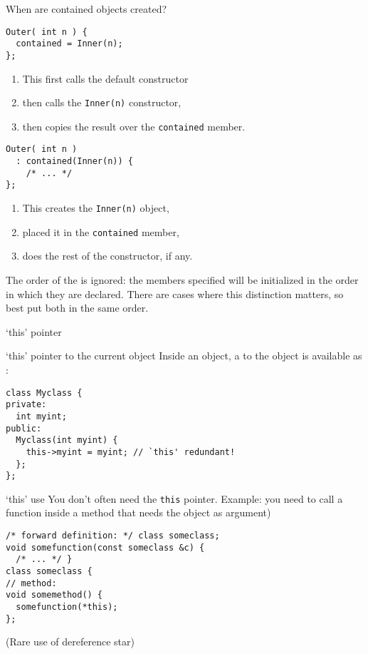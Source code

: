 \begin{block}{When are contained objects created?}
  \label{sl:construct-contained2}
\begin{multicols}{2}
\begin{lstlisting}
Outer( int n ) {
  contained = Inner(n);
};
\end{lstlisting}
  \begin{enumerate}
  \item This first calls the default constructor
  \item then calls the \lstinline+Inner(n)+ constructor,
  \item then copies the result over the \lstinline+contained+ member.
  \end{enumerate}
\columnbreak
\begin{lstlisting}
Outer( int n ) 
  : contained(Inner(n)) {
    /* ... */
};
\end{lstlisting}
\begin{enumerate}
\item This creates the \lstinline+Inner(n)+ object,
\item placed it in the \lstinline+contained+ member,
\item does the rest of the constructor, if any.
\end{enumerate}
\end{multicols}
\end{block}

\begin{remark}
  The order of the  is ignored: the members
  specified will be initialized in the order in which they are declared.
  There are cases where this distinction matters, so best put both in the same order.
\end{remark}

 {`this' pointer}

\begin{block}{`this' pointer to the current object}
  \label{sl:class-this}
  Inside an object, a  to the object is available
  as :
  \lstset{style=snippetcode}
\begin{lstlisting}
class Myclass {
private:
  int myint;
public:
  Myclass(int myint) {
    this->myint = myint; // `this' redundant!
  };
};
\end{lstlisting}
\end{block}

\begin{block}{`this' use}
  \label{sl:class-this-fun}
You don't often need the \lstinline{this} pointer. Example:
you need to call a function inside a method that needs the object as argument)
  \lstset{style=snippetcode}
\begin{lstlisting}
/* forward definition: */ class someclass;
void somefunction(const someclass &c) {
  /* ... */ }
class someclass {
// method:
void somemethod() {
  somefunction(*this);
};
\end{lstlisting}
(Rare use of dereference star)
\end{block}

